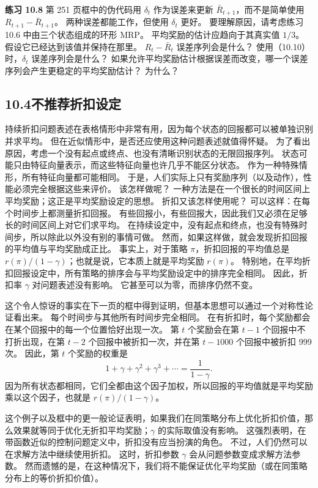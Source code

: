 \documentclass[UTF8, 12pt, fontset=fandol, oneside]{ctexart}
\begin{document}
\noindent\textbf{练习 10.8}
第 251 页框中的伪代码用 $\delta_t$ 作为误差来更新 $\bar R_{t+1}$，而不是简单使用 $R_{t+1}-\bar R_{t+1}$。
两种误差都能工作，但使用 $\delta_t$ 更好。
要理解原因，请考虑练习 10.6 中由三个状态组成的环形 MRP。
平均奖励的估计应趋向于其真实值 $1/3$。
假设它已经达到该值并保持在那里。
$R_t-\bar R_t$ 误差序列会是什么？
使用（10.10）时，$\delta_t$ 误差序列会是什么？
如果允许平均奖励估计根据误差而改变，哪一个误差序列会产生更稳定的平均奖励估计？
为什么？

\subsection*{10.4\quad 不推荐折扣设定}

持续折扣问题表述在表格情形中非常有用，因为每个状态的回报都可以被单独识别并求平均。
但在近似情形中，是否还应使用这种问题表述就值得怀疑。
为了看出原因，考虑一个没有起点或终点、也没有清晰识别状态的无限回报序列。
状态可能只由特征向量表示，而这些特征向量也许几乎不能区分状态。
作为一种特殊情形，所有特征向量都可能相同。
于是，人们实际上只有奖励序列（以及动作），性能必须完全根据这些来评价。
该怎样做呢？
一种方法是在一个很长的时间区间上平均奖励；这正是平均奖励设定的思想。
折扣又该怎样使用呢？
可以这样：在每个时间步上都测量折扣回报。
有些回报小，有些回报大，因此我们又必须在足够长的时间区间上对它们求平均。
在持续设定中，没有起点和终点，也没有特殊时间步，所以除此以外没有别的事情可做。
然而，如果这样做，就会发现折扣回报的平均值与平均奖励成正比。
事实上，对于策略 $\pi$，折扣回报的平均值总是 $r(\pi)/(1-\gamma)$；也就是说，它本质上就是平均奖励 $r(\pi)$。
特别地，在平均折扣回报设定中，所有策略的排序会与平均奖励设定中的排序完全相同。
因此，折扣率 $\gamma$ 对问题表述没有影响。
它甚至可以为零，而排序仍然不变。

这个令人惊讶的事实在下一页的框中得到证明，但基本思想可以通过一个对称性论证看出来。
每个时间步与其他所有时间步完全相同。
在有折扣时，每个奖励都会在某个回报中的每一个位置恰好出现一次。
第 $t$ 个奖励会在第 $t-1$ 个回报中不打折出现，在第 $t-2$ 个回报中被折扣一次，并在第 $t-1000$ 个回报中被折扣 999 次。
因此，第 $t$ 个奖励的权重是
\[
1+\gamma+\gamma^2+\gamma^3+\cdots=\frac{1}{1-\gamma}.
\]
因为所有状态都相同，它们全都由这个因子加权，所以回报的平均值就是平均奖励乘以这个因子，也就是 $r(\pi)/(1-\gamma)$。

这个例子以及框中的更一般论证表明，如果我们在同策略分布上优化折扣价值，那么效果就等同于优化无折扣平均奖励；$\gamma$ 的实际取值没有影响。
这强烈表明，在带函数近似的控制问题定义中，折扣没有应当扮演的角色。
不过，人们仍然可以在求解方法中继续使用折扣。
这时，折扣参数 $\gamma$ 会从问题参数变成求解方法参数。
然而遗憾的是，在这种情况下，我们将不能保证优化平均奖励（或在同策略分布上的等价折扣价值）。
\end{document}

